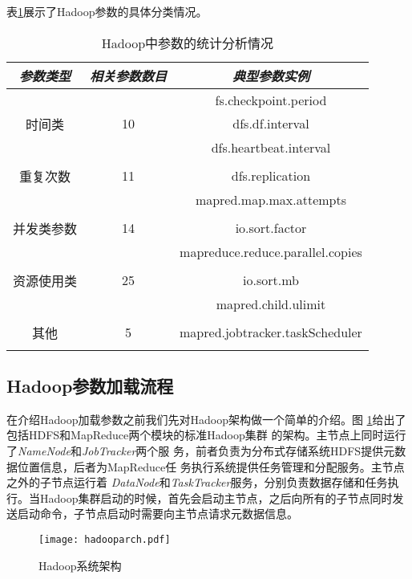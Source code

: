 表\ref{table:hadoopvars}展示了Hadoop参数的具体分类情况。

\begin{table}[h]\small
  \caption{Hadoop中参数的统计分析情况}
  \label{table:hadoopvars}
  \centering
  \begin{tabular}{|c|c|c|}
    \hline
    \textit{参数类型} & \textit{相关参数数目} & \textit{典型参数实例}\\
    \hline
    & & fs.checkpoint.period \\
    时间类 &  10 & dfs.df.interval \\
    & & dfs.heartbeat.interval \\
    \hline
    & & \\
    重复次数 & 11 & dfs.replication\\
    & & mapred.map.max.attempts\\
    \hline
    & & \\
    并发类参数 & 14 & io.sort.factor\\
    & & mapreduce.reduce.parallel.copies\\
    \hline
    & & \\
    资源使用类 & 25 & io.sort.mb\\
    & & mapred.child.ulimit\\
    \hline
    & & \\
    其他 & 5 & mapred.jobtracker.taskScheduler\\
    & & \\
    \hline
  \end{tabular}
\end{table}

\subsection{Hadoop参数加载流程}
在介绍Hadoop加载参数之前我们先对Hadoop架构做一个简单的介绍。图
\ref{fig:hadooparch}给出了包括HDFS和MapReduce两个模块的标准Hadoop集群
的架构。主节点上同时运行了\textit{NameNode}和\textit{JobTracker}两个服
务，前者负责为分布式存储系统HDFS提供元数据位置信息，后者为MapReduce任
务执行系统提供任务管理和分配服务。主节点之外的子节点运行着
\textit{DataNode}和\textit{TaskTracker}服务，分别负责数据存储和任务执
行。当Hadoop集群启动的时候，首先会启动主节点，之后向所有的子节点同时发
送启动命令，子节点启动时需要向主节点请求元数据信息。

\begin{figure}[h!]
  \centering
  \texttt{[image: hadooparch.pdf]}
  \caption{Hadoop系统架构}
  \label{fig:hadooparch}
\end{figure}

